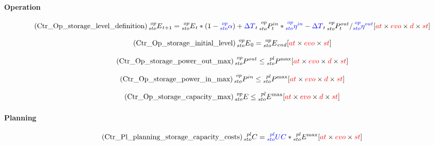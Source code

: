 \documentclass{article}
\begin{document}
\paragraph{Operation}

\begin{equation} \tag{Ctr\_Op\_storage\_level\_definition}
    \prescript{op}{sto}{E}_{t+1} = \prescript{op}{sto}{E}_{t} * (1-\textcolor{blue}{\prescript{op}{sto}{\alpha}})+ \textcolor{blue}{\Delta T }_t\prescript{op}{sto}{P^{in}_t}*\textcolor{blue}{\prescript{op}{sto}{\eta^{in}}} - \textcolor{blue}{\Delta T }_t\prescript{op}{sto}{P^{out}_t} / \textcolor{blue}{\prescript{op}{sto}{\eta^{out}}} \hfill [\textcolor{red}{at} \times \textcolor{red}{evo} \times \textcolor{red}{d} \times \textcolor{red}{st}]
\label{eq:Ctr_Op_storage_level_definition}
\end{equation}

\begin{equation} \tag{Ctr\_Op\_storage\_initial\_level}
    \prescript{op}{sto}{E}_{0} =  \prescript{op}{sto}{E}_{end} \hfill [\textcolor{red}{at} \times \textcolor{red}{evo} \times \textcolor{red}{st}]
\label{eq:Ctr_Op_storage_initial_level}
\end{equation}

\begin{equation} \tag{Ctr\_Op\_storage\_power\_out\_max}
    \prescript{op}{sto}{P^{out}} \leq \prescript{pl}{sto}{P^{\max}} \hfill [\textcolor{red}{at} \times \textcolor{red}{evo}\times \textcolor{red}{d}  \times \textcolor{red}{st}]
\label{eq:Ctr_Op_storage_power_in_max}
\end{equation}

\begin{equation} \tag{Ctr\_Op\_storage\_power\_in\_max}
    \prescript{op}{sto}{P^{in}} \leq \prescript{pl}{sto}{P^{\max}} \hfill [\textcolor{red}{at} \times \textcolor{red}{evo}\times \textcolor{red}{d}  \times \textcolor{red}{st}]
\label{eq:Ctr_Op_storage_power_out_max}
\end{equation}

\begin{equation} \tag{Ctr\_Op\_storage\_capacity\_max}
    \prescript{op}{sto}{E} \leq \prescript{pl}{sto}{E^{\max}} \hfill [\textcolor{red}{at} \times \textcolor{red}{evo}\times \textcolor{red}{d}  \times \textcolor{red}{st}]
\label{eq:Ctr_Op_storage_capacity_max}
\end{equation}


\paragraph{Planning}
\begin{equation} \tag{Ctr\_Pl\_planning\_storage\_capacity\_costs}
    \prescript{pl}{sto}{C} = \textcolor{blue}{\prescript{pl}{sto}{UC}} *    \prescript{pl}{sto}{E^{\max}} \hfill [\textcolor{red}{at} \times \textcolor{red}{evo} \times \textcolor{red}{st}]
\label{eq:Ctr_Pl_planning_storage_capacity_costs}
\end{equation}
\end{document}
